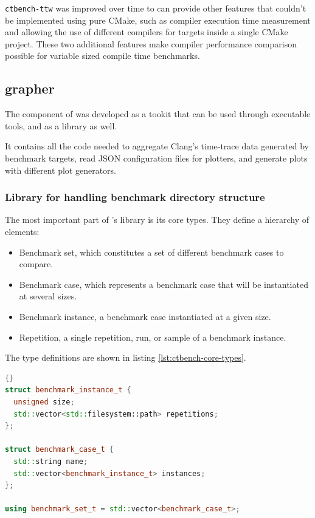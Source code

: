 \documentclass[../../main.tex]{subfiles}
\begin{document}
\lstinline{ctbench-ttw} was improved over time to can provide other features
that couldn't be implemented using pure CMake, such as compiler execution time
measurement and allowing the use of different compilers for targets inside a
single CMake project. These two additional features make compiler performance
comparison possible for variable sized compile time benchmarks.

\subsection{grapher}

The \grapher component of \ctbench was developed as a tookit that can be used
through executable tools, and as a \cpp library as well.

It contains all the code needed to aggregate Clang's time-trace data generated
by \ctbench benchmark targets, read JSON configuration files for plotters, and
generate plots with different plot generators.

\subsubsection{Library for handling benchmark directory structure}

The most important part of \ctbench's \grapher library is its core types.
They define a hierarchy of elements:

\begin{itemize}
\item Benchmark set, which constitutes a set of different benchmark cases to
      compare.
\item Benchmark case, which represents a benchmark case that will be
      instantiated at several sizes.
\item Benchmark instance, a benchmark case instantiated at a given size.
\item Repetition, a single repetition, run, or sample of a benchmark instance.
\end{itemize}

The type definitions are shown in listing \ref{lst:ctbench-core-types}.

\begin{lstlisting}[language=C++, label=lst:ctbench-core-types]{}
struct benchmark_instance_t {
  unsigned size;
  std::vector<std::filesystem::path> repetitions;
};

struct benchmark_case_t {
  std::string name;
  std::vector<benchmark_instance_t> instances;
};

using benchmark_set_t = std::vector<benchmark_case_t>;
\end{lstlisting}
\end{document}
